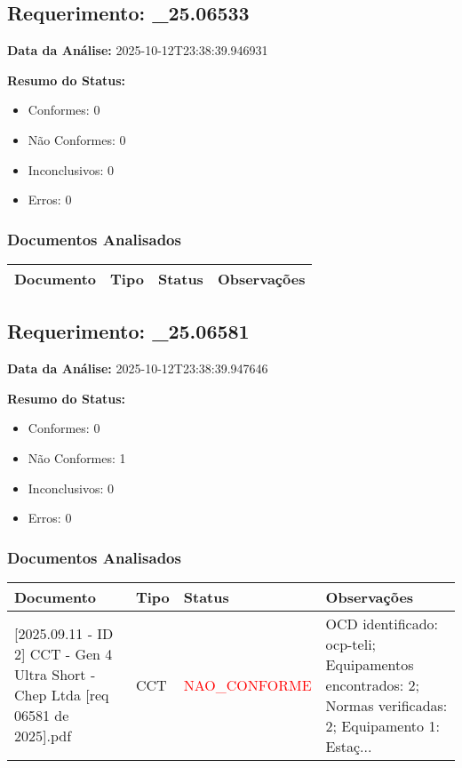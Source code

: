 \documentclass[12pt,a4paper]{article}
\begin{document}
\subsection{Requerimento: \_25.06533}

\textbf{Data da Análise:} 2025-10-12T23:38:39.946931

\textbf{Resumo do Status:}
\begin{itemize}
    \item Conformes: 0
    \item Não Conformes: 0
    \item Inconclusivos: 0
    \item Erros: 0
\end{itemize}

\subsubsection{Documentos Analisados}

\begin{longtable}{|p{4cm}|p{2cm}|p{2cm}|p{6cm}|}
\hline
\textbf{Documento} & \textbf{Tipo} & \textbf{Status} & \textbf{Observações} \\
\hline
\endhead
\end{longtable}


\subsection{Requerimento: \_25.06581}

\textbf{Data da Análise:} 2025-10-12T23:38:39.947646

\textbf{Resumo do Status:}
\begin{itemize}
    \item Conformes: 0
    \item Não Conformes: 1
    \item Inconclusivos: 0
    \item Erros: 0
\end{itemize}

\subsubsection{Documentos Analisados}

\begin{longtable}{|p{4cm}|p{2cm}|p{2cm}|p{6cm}|}
\hline
\textbf{Documento} & \textbf{Tipo} & \textbf{Status} & \textbf{Observações} \\
\hline
\endhead
[Certificado de Conformidade Técnica - CCT][2025.09.11 - ID 2] CCT - Gen 4 Ultra Short - Chep Ltda [req 06581 de 2025].pdf & CCT & \textcolor{red}{NAO\_CONFORME} & OCD identificado: ocp-teli; Equipamentos encontrados: 2; Normas verificadas: 2; Equipamento 1: Estaç... \\
\hline
\end{longtable}
\end{document}

